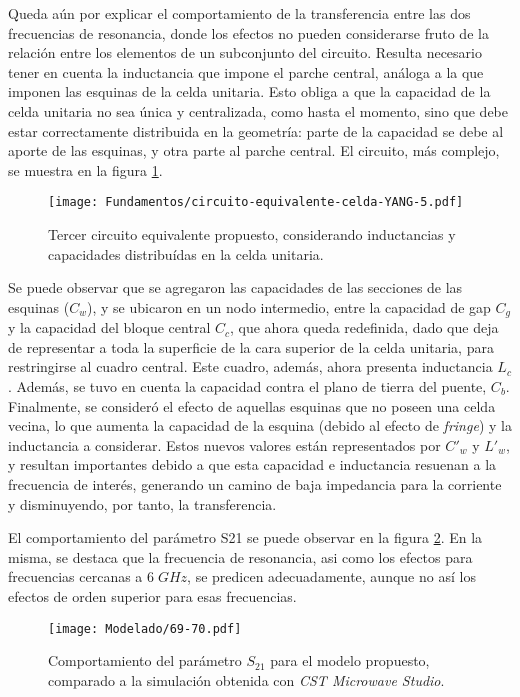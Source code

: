 Queda aún por explicar el comportamiento de la transferencia entre las dos frecuencias de resonancia, donde los efectos no pueden considerarse fruto de la relación entre los elementos de un subconjunto del circuito. Resulta necesario tener en cuenta la inductancia que impone el parche central, análoga a la que imponen las esquinas de la celda unitaria. Esto obliga a que la capacidad de la celda unitaria no sea única y centralizada, como hasta el momento, sino que debe estar correctamente distribuida en la geometría: parte de la capacidad se debe al aporte de las esquinas, y otra parte al parche central. El circuito, más complejo, se muestra en la figura \ref{fig:modelo-circuital-todojunto-sinR}.

\begin{figure}[h]
	\centering
	\texttt{[image: Fundamentos/circuito-equivalente-celda-YANG-5.pdf]}
	\caption{Tercer circuito equivalente propuesto, considerando inductancias y capacidades distribuídas en la celda unitaria.}
	\label{fig:modelo-circuital-todojunto-sinR}
\end{figure}

Se puede observar que se agregaron las capacidades de las secciones de las esquinas ($C_w$), y se ubicaron en un nodo intermedio, entre la capacidad de gap $C_g$ y la capacidad del bloque central $C_c$, que ahora queda redefinida, dado que deja de representar a toda la superficie de la cara superior de la celda unitaria, para restringirse al cuadro central. Este cuadro, además, ahora presenta inductancia $L_c$. Además, se tuvo en cuenta la capacidad contra el plano de tierra del puente, $C_b$. Finalmente, se consideró el efecto de aquellas esquinas que no poseen una celda vecina, lo que aumenta la capacidad de la esquina (debido al efecto de \textit{fringe}) y la inductancia a considerar. Estos nuevos valores están representados por $C'_w$ y $L'_w$, y resultan importantes debido a que esta capacidad e inductancia resuenan a la frecuencia de interés, generando un camino de baja impedancia para la corriente y disminuyendo, por tanto, la transferencia.

El comportamiento del parámetro S21 se puede observar en la figura \ref{fig:s21-total-sin-R}. En la misma, se destaca que la frecuencia de resonancia, asi como los efectos para frecuencias cercanas a $6\; GHz$, se predicen adecuadamente, aunque no así los efectos de orden superior para esas frecuencias.

\begin{figure}[h]
	\centering
	\texttt{[image: Modelado/69-70.pdf]}
	\caption{Comportamiento del parámetro $S_{21}$ para el modelo propuesto, comparado a la simulación obtenida con \textit{CST Microwave Studio}.}
	\label{fig:s21-total-sin-R}
\end{figure}

